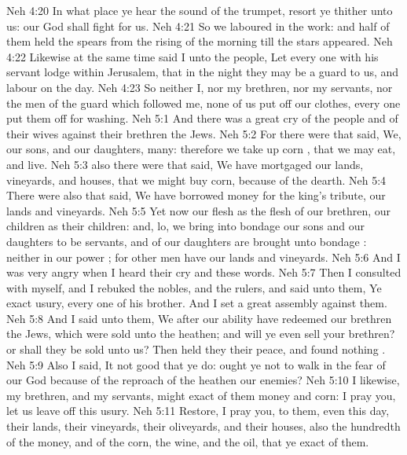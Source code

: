 \vs Neh 4:20 In what place  ye hear the sound of the trumpet, resort ye thither unto us: our God shall fight for us.
\vs Neh 4:21 So we laboured in the work: and half of them held the spears from the rising of the morning till the stars appeared.
\vs Neh 4:22 Likewise at the same time said I unto the people, Let every one with his servant lodge within Jerusalem, that in the night they may be a guard to us, and labour on the day.
\vs Neh 4:23 So neither I, nor my brethren, nor my servants, nor the men of the guard which followed me, none of us put off our clothes,  every one put them off for washing.
\vs Neh 5:1 And there was a great cry of the people and of their wives against their brethren the Jews.
\vs Neh 5:2 For there were that said, We, our sons, and our daughters,  many: therefore we take up corn , that we may eat, and live.
\vs Neh 5:3  also there were that said, We have mortgaged our lands, vineyards, and houses, that we might buy corn, because of the dearth.
\vs Neh 5:4 There were also that said, We have borrowed money for the king's tribute,  our lands and vineyards.
\vs Neh 5:5 Yet now our flesh  as the flesh of our brethren, our children as their children: and, lo, we bring into bondage our sons and our daughters to be servants, and  of our daughters are brought unto bondage : neither  in our power ; for other men have our lands and vineyards.
\vs Neh 5:6 And I was very angry when I heard their cry and these words.
\vs Neh 5:7 Then I consulted with myself, and I rebuked the nobles, and the rulers, and said unto them, Ye exact usury, every one of his brother. And I set a great assembly against them.
\vs Neh 5:8 And I said unto them, We after our ability have redeemed our brethren the Jews, which were sold unto the heathen; and will ye even sell your brethren? or shall they be sold unto us? Then held they their peace, and found nothing .
\vs Neh 5:9 Also I said, It  not good that ye do: ought ye not to walk in the fear of our God because of the reproach of the heathen our enemies?
\vs Neh 5:10 I likewise,  my brethren, and my servants, might exact of them money and corn: I pray you, let us leave off this usury.
\vs Neh 5:11 Restore, I pray you, to them, even this day, their lands, their vineyards, their oliveyards, and their houses, also the hundredth  of the money, and of the corn, the wine, and the oil, that ye exact of them.
